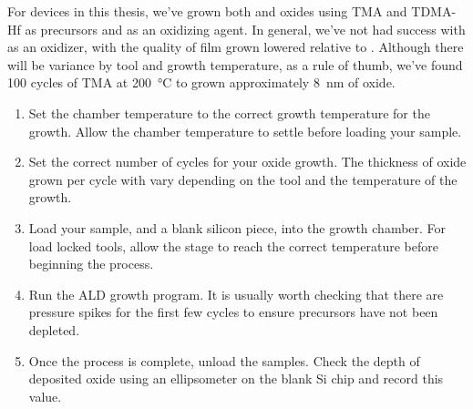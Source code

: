 For devices in this thesis, we've grown both  and  oxides using TMA and TDMA-Hf as precursors and
 as an oxidizing agent. In general, we've not had success with  as an oxidizer, with the quality of film
grown lowered relative to . Although there will be variance by tool and growth temperature, as a rule of thumb,
we've found 100 cycles of TMA at \SI{200}{\celsius} to grown approximately \SI{8}{\nano\meter} of oxide.


\begin{enumerate}
    \item Set the chamber temperature to the correct growth temperature for the growth. Allow the chamber temperature to settle before loading your sample.
    \item Set the correct number of cycles for your oxide growth. The thickness of oxide grown per cycle with vary depending on the tool and the temperature of the growth.
    \item Load your sample, and a blank silicon piece, into the growth chamber. For load locked tools, allow the stage to reach the correct temperature before beginning the process.
    \item Run the ALD growth program. It is usually worth checking that there are pressure spikes for the first few cycles to ensure precursors have not been depleted.
    \item Once the process is complete, unload the samples. Check the depth of deposited oxide using an ellipsometer on the blank Si chip and record this value.
\end{enumerate}